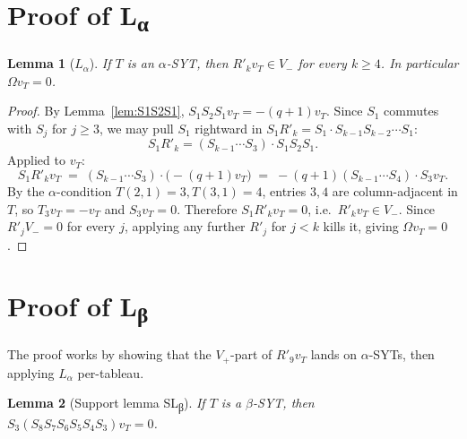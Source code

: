 \documentclass[11pt]{article}
\newtheorem{lemma}{Lemma}
\newcommand{\Vp}{V_{+}}
\newcommand{\Vm}{V_{-}}
\begin{document}
\section{Proof of L\textsubscript{α}}

\begin{lemma}[$L_\alpha$] \label{lem:Lalpha}
If $T$ is an $\alpha$-SYT, then $R'_k v_T \in \Vm$ for every $k \ge 4$.
In particular $\Omega v_T = 0$.
\end{lemma}

\begin{proof}
By Lemma~\ref{lem:S1S2S1}, $S_1 S_2 S_1 v_T = -(q+1) v_T$. Since $S_1$ commutes
with $S_j$ for $j \ge 3$, we may pull $S_1$ rightward in $S_1 R'_k =
S_1 \cdot S_{k-1} S_{k-2} \cdots S_1$:
\[
S_1 R'_k = (S_{k-1} \cdots S_3) \cdot S_1 S_2 S_1.
\]
Applied to $v_T$:
\[
S_1 R'_k v_T \;=\; (S_{k-1} \cdots S_3) \cdot \bigl(-(q+1) v_T\bigr)
\;=\; -(q+1) (S_{k-1} \cdots S_4) \cdot S_3 v_T.
\]
By the $\alpha$-condition $T(2,1)=3, T(3,1)=4$, entries $3,4$ are column-adjacent
in $T$, so $T_3 v_T = -v_T$ and $S_3 v_T = 0$. Therefore $S_1 R'_k v_T = 0$,
i.e.\ $R'_k v_T \in \Vm$. Since $R'_j \Vm = 0$ for every $j$, applying any further
$R'_j$ for $j < k$ kills it, giving $\Omega v_T = 0$.
\end{proof}

\section{Proof of L\textsubscript{β}}

The proof works by showing that the $\Vp$-part of $R'_9 v_T$ lands on $\alpha$-SYTs,
then applying $L_\alpha$ per-tableau.

\begin{lemma}[Support lemma SL\textsubscript{β}] \label{lem:SLbeta}
If $T$ is a $\beta$-SYT, then $S_3 (S_8 S_7 S_6 S_5 S_4 S_3) v_T = 0$.
\end{lemma}
\end{document}
